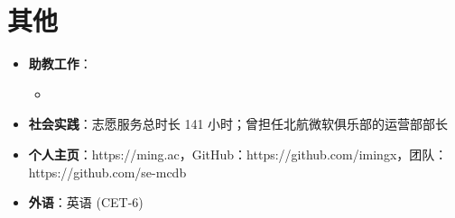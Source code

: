 \documentclass{resume}
\begin{document}

\section{其他}
\begin{itemize}
  \item \textbf{助教工作}：
        \begin{itemize}
          \item {}
        \end{itemize}
  \item \textbf{社会实践}：志愿服务总时长 141 小时；曾担任北航微软俱乐部的运营部部长
  \item \textbf{个人主页}：https://ming.ac，GitHub：https://github.com/imingx，团队：https://github.com/se-mcdb
  \item \textbf{外语}：英语 (CET-6)
\end{itemize}
\end{document}
